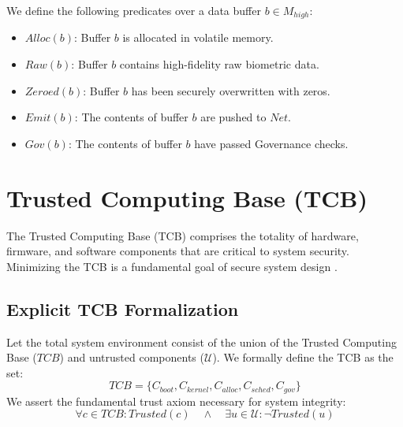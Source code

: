 \documentclass[conference]{IEEEtran}
\begin{document}
We define the following predicates over a data buffer $b \in M_{high}$:
\begin{itemize}
    \item $Alloc(b)$: Buffer $b$ is allocated in volatile memory.
    \item $Raw(b)$: Buffer $b$ contains high-fidelity raw biometric data.
    \item $Zeroed(b)$: Buffer $b$ has been securely overwritten with zeros.
    \item $Emit(b)$: The contents of buffer $b$ are pushed to $Net$.
    \item $Gov(b)$: The contents of buffer $b$ have passed Governance checks.
\end{itemize}

\section{Trusted Computing Base (TCB)}
The Trusted Computing Base (TCB) comprises the totality of hardware, firmware, and software components that are critical to system security. Minimizing the TCB is a fundamental goal of secure system design \cite{b3}. 

\subsection{Explicit TCB Formalization}
Let the total system environment consist of the union of the Trusted Computing Base ($TCB$) and untrusted components ($\mathcal{U}$). We formally define the TCB as the set:
\begin{equation}
TCB = \{ C_{boot}, C_{kernel}, C_{alloc}, C_{sched}, C_{gov} \}
\end{equation}
We assert the fundamental trust axiom necessary for system integrity:
\begin{equation}
\forall c \in TCB : Trusted(c) \quad \land \quad \exists u \in \mathcal{U} : \neg Trusted(u)
\end{equation}
\end{document}
